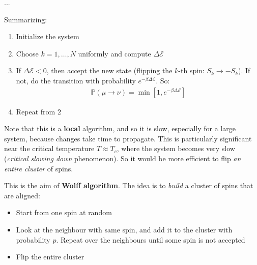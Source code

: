 \documentclass[../template.tex]{subfiles}
\begin{document}
...

Summarizing:
\begin{enumerate}
    \item Initialize the system
    \item Choose $k=1,\dots,N$ uniformly and compute $\Delta \mathcal{E}$
    \item If $\Delta \mathcal{E}< 0$, then accept the new state (flipping the $k$-th spin: $S_k \to -S_k$). If not, do the transition with probability $e^{-\beta \Delta \mathcal{E}}$. So:
    \begin{align*}
        \mathbb{P}(\mu \to \nu) = \min[1, e^{-\beta \Delta \mathcal{E}}]
    \end{align*}
    \item Repeat from $2$
\end{enumerate}

Note that this is a \textbf{local} algorithm, and so it is slow, especially for a large system, because changes take time to propagate. This is particularly significant near the critical temperature $T \approx T_c$, where the system becomes very slow (\textit{critical slowing down} phenomenon). So it would be more efficient to flip \textit{an entire cluster} of spins.

\medskip

This is the aim of \textbf{Wolff algorithm}. The idea is to \textit{build} a cluster of spins that are aligned:
\begin{itemize}
    \item Start from one spin at random
    \item Look at the neighbour with same spin, and add it to the cluster with probability $p$. Repeat over the neighbours until some spin is not accepted
    \item Flip the entire cluster
\end{itemize}


  




\end{document}

